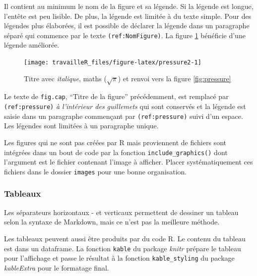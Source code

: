 \documentclass[
  12pt,
  french,
  a4paper,
  extrafontsizes,onecolumn,openright
  ]{memoir}
\begin{document}
Il contient au minimum le nom de la figure et sa légende.
Si la légende est longue, l'entête est peu lisible.
De plus, la légende est limitée à du texte simple.
Pour des légendes plus élaborées, il est possible de déclarer la légende dans un paragraphe séparé qui commence par le texte \texttt{(ref:NomFigure)}.
La figure \ref{fig:pressure2} bénéficie d'une légende améliorée.



\scriptsize

\begin{figure}

{\centering \texttt{[image: travailleR\_files/figure-latex/pressure2-1]} 

}

\caption{Titre avec \emph{italique}, maths (\(\sqrt\pi\)) et renvoi vers la figure \ref{fig:pressure}}\label{fig:pressure2}
\end{figure}

\normalsize

Le texte de \texttt{fig.cap}, \enquote{Titre de la figure} précédemment, est remplacé par \texttt{(ref:pressure)} \emph{à l'intérieur des guillemets} qui sont conservés et la légende est saisie dans un paragraphe commençant par \texttt{(ref:pressure)} suivi d'un espace.
Les légendes sont limitées à un paragraphe unique.

Les figures qui ne sont pas créées par R mais proviennent de fichiers sont intégrées dans un bout de code par la fonction \texttt{include\_graphics()} dont l'argument est le fichier contenant l'image à afficher.
Placer systématiquement ces fichiers dans le dossier \texttt{images} pour une bonne organisation.

\hypertarget{tableaux}{%
\subsubsection{Tableaux}\label{tableaux}}

Les séparateurs horizontaux - et verticaux \textbar{} permettent de dessiner un tableau selon la syntaxe de Markdown, mais ce n'est pas la meilleure méthode.

Les tableaux peuvent aussi être produits par du code R.
Le contenu du tableau est dans un dataframe.
La fonction \texttt{kable} du package \emph{knitr} prépare le tableau pour l'affichage et passe le résultat à la fonction \texttt{kable\_styling} du package \emph{kableExtra} pour le formatage final.

\scriptsize
\end{document}
